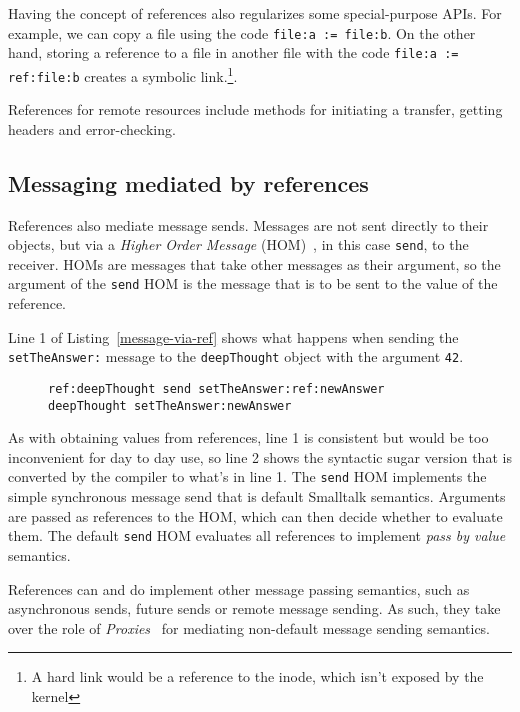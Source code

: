 \documentclass[preprint]{sigplanconf}
\begin{document}
Having the concept of references also regularizes some special-purpose APIs.  For example,
we can copy a file using the code {\tt file:a := file:b}.  On the other hand, storing a reference 
to a file in another file with the code {\tt file:a := ref:file:b} creates a symbolic link.\footnote{A hard link
would be a reference to the inode, which isn't exposed by the kernel}.

References for remote resources include methods for initiating a transfer, getting headers and 
error-checking.

\subsection{Messaging mediated by references}

References also mediate message sends.   Messages are not sent directly to their objects, but via a
\emph{Higher Order Message} (HOM)~\cite{HOM}, in this case {\tt send}, to the receiver.    HOMs
are messages that take other messages as their argument, so the argument of the {\tt send} HOM is the
message that is to be sent to the value of the reference.  

  Line 1 of Listing~\ref{message-via-ref} shows
what happens when sending the {\tt setTheAnswer:} message to the {\tt deepThought} object with
the argument {\tt 42}.

\begin{figure}[htbp]
\begin{lstlisting}[style=numbers,label=message-via-ref,caption=Message sending via reference and with syntactic sugar]
ref:deepThought send setTheAnswer:ref:newAnswer
deepThought setTheAnswer:newAnswer
\end{lstlisting}
\end{figure}

As with obtaining values from references, line 1 is consistent but would be too inconvenient for day to day use,
so line 2 shows the syntactic sugar version that is converted by the compiler to what's in line 1.  The {\tt send}
HOM implements the simple synchronous message send that is default Smalltalk semantics.   Arguments
are passed as references to the HOM, which can then decide whether to evaluate them.  The default {\tt send}
HOM evaluates all references to implement \emph{pass by value} semantics.

References can and do implement other message passing semantics, such as asynchronous sends, future
sends or remote message sending.  As such, they take over the role of \emph{Proxies}~\cite{VanCutsemMiller} for mediating non-default
message sending semantics.  
\end{document}
